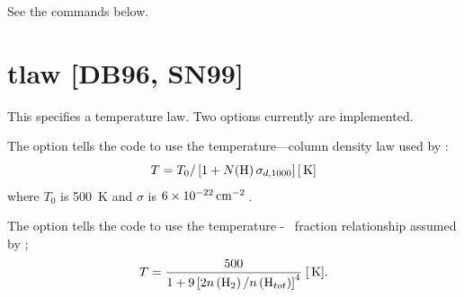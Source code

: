 See the  commands below.

\section{tlaw [DB96, SN99]}

This specifies a temperature law.
Two options currently are implemented.

The  option tells the code to use
the temperature---column density
law used by \citet{Draine1996}:
\begin{equation}
T = T_0 /\left[ {1 + N({\mathrm{H}})\,\sigma _{d{,}1000} } \right]
 [{\rm\thinspace K} ]
\end{equation}
where $T_0$ is 500~K and $\sigma$ is $6\times 10^{-22} \mbox{${\rm\thinspace cm}^{-2}\,$}$.

The  option tells the code to use
the temperature - \htwo\ fraction
relationship assumed by \citet{Sternberg1999};
\begin{equation}
T = \frac{{500}}{{1 + 9\left[ {2n\left( {{\mathrm{H}}_2 } \right)/n\left(
{{\mathrm{H}}_{tot} } \right)} \right]^4 }}
 \; [{\rm\thinspace K}].
\end{equation}


